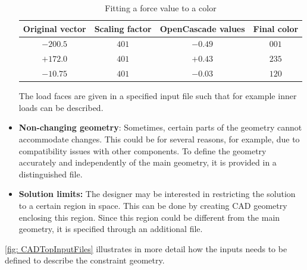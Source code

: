 \begin{itemize}
\begin{table}[h!]
	\begin{center}
		\caption{Fitting a force value to a color}
		\label{LoadFaceExample}
		\begin{tabular}{cccc}
			\toprule
			{\small Original vector} & {\small Scaling factor} & {\small OpenCascade values} & {\small Final color}\\
			\midrule
			$-200.5$ & $401$ & $-0.49$ & $001$\\
			$+172.0$ & $401$ & $+0.43$ & $235$\\
			$-10.75$ & $401$ & $-0.03$ & $120$\\
			\bottomrule
		\end{tabular}
	\end{center}
\end{table}

The load faces are given in a specified input file such that for example inner loads can be described.

	\item \textbf{Non-changing geometry}: Sometimes, certain parts of the geometry cannot accommodate changes. This could be for several reasons, for example, due to compatibility issues with other components. To define the geometry accurately and independently of the main geometry, it is provided in a distinguished file.%
	\item \textbf{Solution limits:} The designer may be interested in restricting the solution to a certain region in space. This can be done by creating CAD geometry enclosing this region. Since this region could be different from the main geometry, it is specified through an additional file.
\end{itemize}

\autoref{fig: CADTopInputFiles} illustrates in more detail how the inputs needs to be defined to describe the constraint geometry. 

